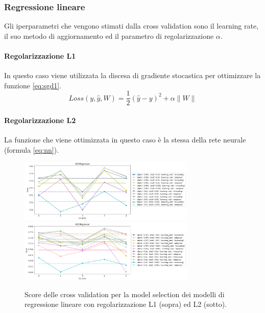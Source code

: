 \documentclass{article}
\begin{document}
\subsubsection{Regressione lineare}
Gli iperparametri che vengono stimati dalla cross validation sono il learning
rate, il suo metodo di aggiornamento ed il parametro di regolarizzazione
$\alpha$.
\paragraph{Regolarizzazione L1}
In questo caso viene utilizzata la discesa di gradiente stocastica per
ottimizzare la funzione \ref{eq:sgd1}.
\begin{equation}
	Loss(y, \hat{y}, W)=\frac{1}{2}(\hat{y}-y)^2 + \alpha\|W\|
	\label{eq:sgd1}
\end{equation}
\paragraph{Regolarizzazione L2} La funzione che viene ottimizzata in questo
caso è la stessa della rete neurale (formula \ref{eq:nn}).
\begin{figure}[ht]
	\centering
	\includegraphics[width=0.75\textwidth]{lassocv.png}
	\includegraphics[width=0.75\textwidth]{ridgecv.png}
	\caption{Score delle cross validation per la model selection dei modelli
	di regressione lineare con regolarizzazione L1 (sopra) ed L2 (sotto).}
\end{figure}
\end{document}
